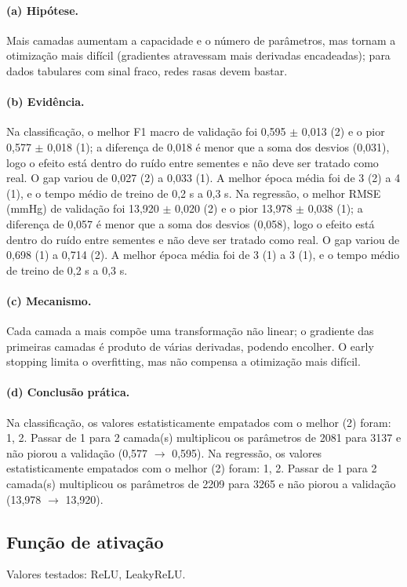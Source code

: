 \documentclass[11pt,a4paper]{article}
\begin{document}
\paragraph{(a) Hipótese.} Mais camadas aumentam a capacidade e o número de parâmetros, mas tornam a otimização mais difícil (gradientes atravessam mais derivadas encadeadas); para dados tabulares com sinal fraco, redes rasas devem bastar.

\paragraph{(b) Evidência.} Na classificação, o melhor F1 macro de validação foi 0,595 $\pm$ 0,013 (2) e o pior 0,577 $\pm$ 0,018 (1); a diferença de 0,018 é menor que a soma dos desvios (0,031), logo o efeito está dentro do ruído entre sementes e não deve ser tratado como real. O gap variou de 0,027 (2) a 0,033 (1). A melhor época média foi de 3 (2) a 4 (1), e o tempo médio de treino de 0,2 s a 0,3 s. Na regressão, o melhor RMSE (mmHg) de validação foi 13,920 $\pm$ 0,020 (2) e o pior 13,978 $\pm$ 0,038 (1); a diferença de 0,057 é menor que a soma dos desvios (0,058), logo o efeito está dentro do ruído entre sementes e não deve ser tratado como real. O gap variou de 0,698 (1) a 0,714 (2). A melhor época média foi de 3 (1) a 3 (1), e o tempo médio de treino de 0,2 s a 0,3 s.

\paragraph{(c) Mecanismo.} Cada camada a mais compõe uma transformação não linear; o gradiente das primeiras camadas é produto de várias derivadas, podendo encolher. O early stopping limita o overfitting, mas não compensa a otimização mais difícil.

\paragraph{(d) Conclusão prática.} Na classificação, os valores estatisticamente empatados com o melhor (2) foram: 1, 2. Passar de 1 para 2 camada(s) multiplicou os parâmetros de 2081 para 3137 e não piorou a validação (0,577 $\to$ 0,595). Na regressão, os valores estatisticamente empatados com o melhor (2) foram: 1, 2. Passar de 1 para 2 camada(s) multiplicou os parâmetros de 2209 para 3265 e não piorou a validação (13,978 $\to$ 13,920).

\subsection{Função de ativação}
Valores testados: ReLU, LeakyReLU.
\end{document}
